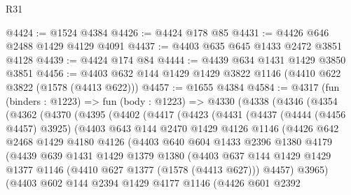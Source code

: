 \begin{lexlean}{R31}
\begin{coremodule}
@4424 := @1524 @4384
@4426 := @4424 @178 @85
@4431 := @4426 @646 @2488 @1429 @4129 @4091
@4437 := @4403 @635 @645 @1433 @2472 @3851 @4128
@4439 := @4424 @174 @84
@4444 := @4439 @634 @1431 @1429 @3850 @3851
@4456 := @4403 @632 @144 @1429 @1429 @3822 @1146 (@4410 @622 @3822 (@1578 (@4413 @622)))
@4457 := @1655 @4384
@4584 := @4317
    (fun (binders : @1223) =>
    fun (body : @1223) =>
    @4330
      (@4338
        (@4346
          (@4354
            (@4362
              (@4370
                (@4395
                  (@4402
                    (@4417
                      (@4423
                        (@4431
                          (@4437
                            (@4444 (@4456 @4457) @3925)
                            (@4403
                              @643
                              @144
                              @2470
                              @1429
                              @4126
                              @1146
                              (@4426
                                @642
                                @2468
                                @1429
                                @4180
                                @4126
                                (@4403
                                  @640
                                  @604
                                  @1433
                                  @2396
                                  @1380
                                  @4179
                                  (@4439
                                    @639
                                    @1431
                                    @1429
                                    @1379
                                    @1380
                                    (@4403
                                      @637
                                      @144
                                      @1429
                                      @1429
                                      @1377
                                      @1146
                                      (@4410 @627 @1377 (@1578 (@4413 @627)))
                                      @4457)
                                    @3965)
                                  (@4403
                                    @602
                                    @144
                                    @2394
                                    @1429
                                    @4177
                                    @1146
                                    (@4426
                                      @601
                                      @2392

\end{coremodule}
\end{lexlean}
